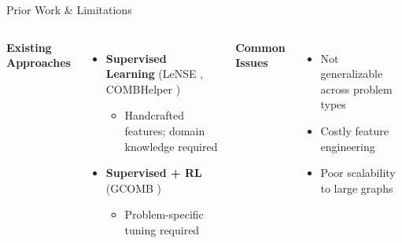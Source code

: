 \documentclass[aspectratio=169,xcolor=dvipsnames]{beamer}
\newcommand{\xmark}{\textcolor{red}{\ding{55}}}
\begin{document}
\begin{frame}[plain]{Prior Work \& Limitations}
\begin{columns}[T,onlytextwidth]
\textbf{Existing Approaches}
\begin{itemize}
    \item \textbf{Supervised Learning} (LeNSE \cite{ireland2022lense}, COMBHelper \cite{tian2024combhelper})
    \begin{itemize}
        \item[\textcolor{red}{\xmark}] Handcrafted features; domain knowledge required
    \end{itemize}
    \item \textbf{Supervised + RL} (GCOMB \cite{manchanda2020gcomb})
    \begin{itemize}
        \item[\textcolor{red}{\xmark}] Problem-specific tuning required
    \end{itemize}
\end{itemize}

\textbf{Common Issues}
\begin{itemize}
    \item [\textcolor{red}{\xmark}] Not generalizable across problem types
    \item [\textcolor{red}{\xmark}] Costly feature engineering
    \item [\textcolor{red}{\xmark}] Poor scalability to large graphs
\end{itemize}
\end{columns}
\end{frame}
\end{document}

